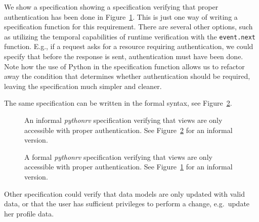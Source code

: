 We show a specification showing a specification verifying that proper
authentication has been done in
Figure~\ref{figure-app-authentication-informal}. This is just one way of
writing a specification function for this requirement. There are several other
options, such as utilizing the temporal capabilities of runtime verification
with the \texttt{event.next} function. E.g., if a request asks for a resource
requiring authentication, we could specify that before the response is sent,
authentication must have been done. Note how the use of Python in the
specification function allows us to refactor away the condition that determines
whether authentication should be required, leaving the specification much
simpler and cleaner.

The same specification can be written in the formal syntax, see
Figure~\ref{figure-app-authentication-formal}.

\begin{figure}[h!]
	\begin{center}
	\begin{minipage}{0.9\textwidth}
	
	\end{minipage}
	\end{center}

  \caption{An informal \textit{pythonrv} specification verifying that views are
    only accessible with proper authentication. See
    Figure~\ref{figure-app-authentication-formal} for an informal version.}
	\label{figure-app-authentication-informal}
\end{figure}

\begin{figure}[h!]
	\begin{center}
	\begin{minipage}{0.9\textwidth}
	
	\end{minipage}
	\end{center}

  \caption{A formal \textit{pythonrv} specification verifying that views are
    only accessible with proper authentication. See
    Figure~\ref{figure-app-authentication-informal} for an informal version.}
	\label{figure-app-authentication-formal}
\end{figure}

Other specification could verify that data models are only updated with valid
data, or that the user has sufficient privileges to perform a change, e.g.\
update her profile data.

